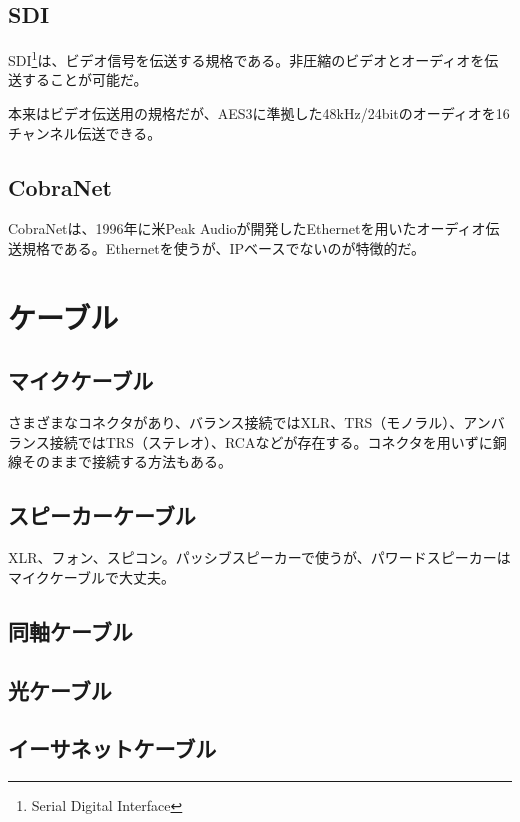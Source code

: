 \subsection{SDI}

SDI\footnote{Serial Digital Interface}は、ビデオ信号を伝送する規格である。非圧縮のビデオとオーディオを伝送することが可能だ。

本来はビデオ伝送用の規格だが、AES3に準拠した48kHz/24bitのオーディオを16チャンネル伝送できる。

\subsection{CobraNet}

CobraNetは、1996年に米Peak Audioが開発したEthernetを用いたオーディオ伝送規格である。Ethernetを使うが、IPベースでないのが特徴的だ\cite{best-practices-in-network-audio}。

\section{ケーブル}

\subsection{マイクケーブル}

さまざまなコネクタがあり、バランス接続ではXLR、TRS（モノラル）、アンバランス接続ではTRS（ステレオ）、RCAなどが存在する。コネクタを用いずに銅線そのままで接続する方法もある。

\subsection{スピーカーケーブル}
XLR、フォン、スピコン。パッシブスピーカーで使うが、パワードスピーカーはマイクケーブルで大丈夫。

\subsection{同軸ケーブル}

\subsection{光ケーブル}

\subsection{イーサネットケーブル}

